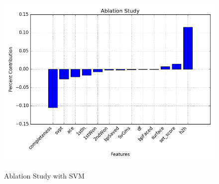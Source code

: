 \documentclass[conference]{IEEEtran}
\begin{document}
	\begin{figure}[h]
		\includegraphics[scale=0.45]{svm_ablation} %
		\label{fig:svm_ablation}
		\centering
		\caption{Ablation Study with SVM}
	\end{figure}
\end{document}
